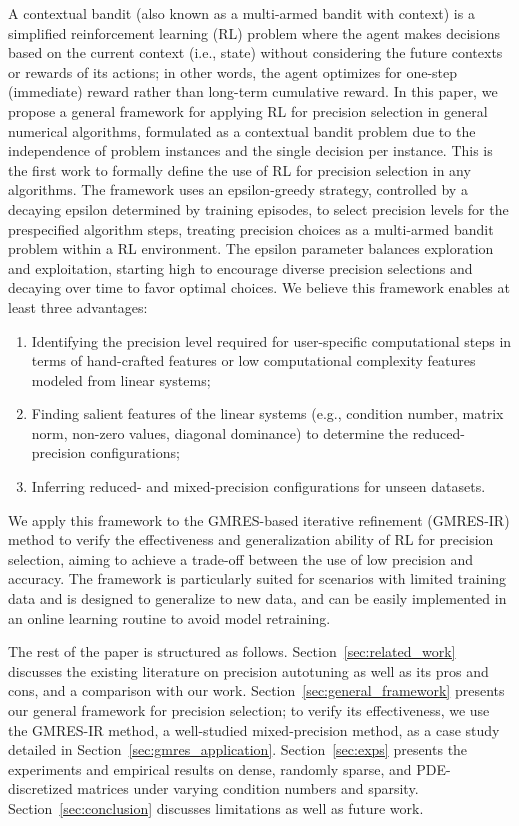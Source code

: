 \documentclass[Afour,sageh,times]{sagej}
\theoremstyle{plain}
\theoremstyle{definition}
\begin{document}
A contextual bandit (also known as a multi-armed bandit with context) is a simplified reinforcement learning (RL) problem where the agent makes decisions based on the current context (i.e., state) without considering the future contexts or rewards of its actions; in other words, the agent optimizes for one-step (immediate) reward rather than long-term cumulative reward. In this paper, we propose a general framework for applying RL for precision selection in general numerical algorithms, formulated as a contextual bandit problem due to the independence of problem instances and the single decision per instance. This is the first work to formally define the use of RL for precision selection in any algorithms. The framework uses an epsilon-greedy strategy, controlled by a decaying epsilon determined by training episodes, to select precision levels for the prespecified algorithm steps, treating precision choices as a multi-armed bandit problem within a RL environment. The epsilon parameter balances exploration and exploitation, starting high to encourage diverse precision selections and decaying over time to favor optimal choices. We believe this framework enables at least three advantages:
\begin{enumerate}
    \item Identifying the precision level required for user-specific computational steps in terms of hand-crafted features or low computational complexity features modeled from linear systems;
    \item Finding salient features of the linear systems (e.g., condition number, matrix norm, non-zero values, diagonal dominance) to determine the reduced-precision configurations;
    \item Inferring reduced- and mixed-precision configurations for unseen datasets.
\end{enumerate}


We apply this framework to the GMRES-based iterative refinement (GMRES-IR) method \cite{doi:10.1137/17M1122918} to verify the effectiveness and generalization ability of RL for precision selection, aiming to achieve a trade-off between the use of low precision and accuracy. The framework is particularly suited for scenarios with limited training data and is designed to generalize to new data, and can be easily implemented in an online learning routine to avoid model retraining.


The rest of the paper is structured as follows. Section~\ref{sec:related_work} discusses the existing literature on precision autotuning as well as its pros and cons, and a comparison with our work. Section~\ref{sec:general_framework} presents our general framework for precision selection;
to verify its effectiveness, we use the GMRES-IR method, a well-studied mixed-precision method, as a case study detailed in Section~\ref{sec:gmres_application}. Section~\ref{sec:exps} presents the experiments and empirical results on dense, randomly sparse, and PDE-discretized matrices under varying condition numbers and sparsity. Section~\ref{sec:conclusion} discusses limitations as well as future work.
\end{document}
